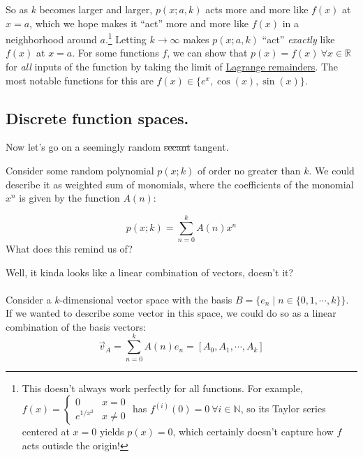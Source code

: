 \documentclass[letterpaper,12pt]{report}
\begin{document}
So as \(k\) becomes larger and larger, \(p(x;a,k)\) acts more and more like \(f(x)\)
at \(x=a\),
which we hope makes it ``act'' more and more like \(f(x)\)
in a neighborhood around \(a\).\footnote
{
  This doesn't always work perfectly for all functions. For example,
  \(f(x) = 
  \begin{cases}
    0 & x = 0 \\
    e^{1/x^2} & x \neq 0
  \end{cases}
  \)
  has \(f^{(i)}(0) = 0 \ \forall i \in \mathbb{N}\), 
  so its Taylor series centered at \(x=0\) yields \(p(x) = 0\),
  which certainly doesn't capture how \(f\) acts outisde the origin!
}
Letting \(k \rightarrow \infty\) makes \(p(x;a,k)\) ``act'' \emph{exactly}
like \(f(x)\) at \(x=a\).
For some functions \(f\), 
we can show that \(p(x) = f(x) \ \forall x\in \mathbb{R}\) for \emph{all} 
inputs of the function
by taking the limit of \href{https://math.stackexchange.com/a/2136695}{Lagrange remainders}.
The most notable functions for this are \(f(x) \in \{e^x,\cos(x),\sin(x)\}\).\par


\subsection{Discrete function spaces.}

Now let's go on a seemingly random \sout{secant} tangent.\par
Consider some random polynomial \(p(x;k)\) of order no greater than \(k\).
We could describe it as weighted sum of monomials, where the coefficients
of the monomial \(x^n\) is given by the function \(A(n)\):

\[p(x;k) = \sum_{n=0}^{k}A(n) x^n\]
What does this remind us of?\par
Well, it kinda looks like a linear combination of vectors, doesn't it?
\\
\\
Consider a \(k\)-dimensional vector space with the basis
\(B = \{e_n \mid n \in \{0, 1, \cdots, k\}\}\).
If we wanted to describe some vector in this space, we could do so as a linear
combination of the basis vectors:
\[ \vec{v}_A = \sum_{n=0}^{k}A(n) e_n = [A_0, A_1, \cdots, A_k]\]
\end{document}
